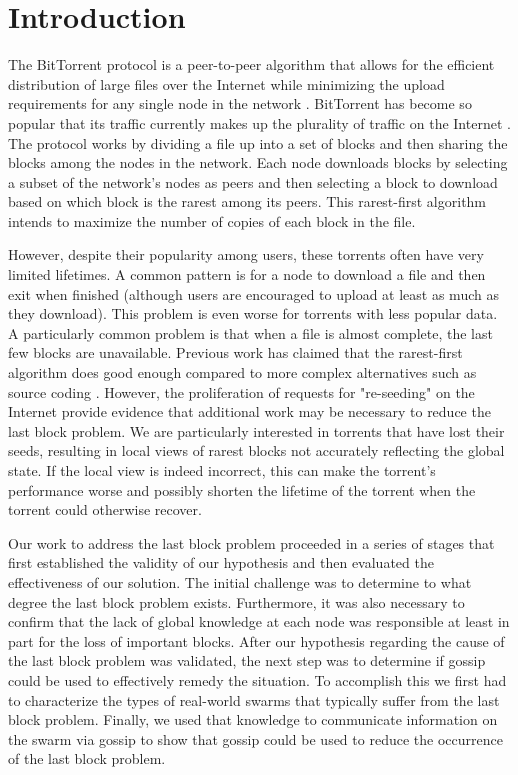 \section{Introduction}

The BitTorrent protocol is a peer-to-peer algorithm that allows for
the efficient distribution of large files over the Internet while
minimizing the upload requirements for any single node in the network
\cite{bep003}. BitTorrent has become so popular that its traffic currently
makes up the plurality of traffic on the Internet \cite{istudy08}. The
protocol works by dividing a file up into a set of blocks and then
sharing the blocks among the nodes in the network. Each node downloads
blocks by selecting a subset of the network's nodes as peers and then
selecting a block to download based on which block is the rarest among
its peers. This rarest-first algorithm intends to maximize the number
of copies of each block in the file.


However, despite their popularity among users, these torrents often have
very limited lifetimes. A common pattern is for a node to download a file
and then exit when finished (although users are encouraged to upload at
least as much as they download). This problem is even worse for torrents
with less popular data. A particularly common problem is that when a file
is almost complete, the last few blocks are unavailable. Previous work
has claimed that the rarest-first algorithm does good enough compared to
more complex alternatives such as source coding \cite{legout:1}. However,
the proliferation of requests for "re-seeding" on the Internet provide
evidence that additional work may be necessary to reduce the last block
problem. We are particularly interested in torrents that have lost
their seeds, resulting in local views of rarest blocks not accurately
reflecting the global state. If the local view is indeed incorrect,
this can make the torrent's performance worse and possibly shorten the
lifetime of the torrent when the torrent could otherwise recover.


Our work to address the last block problem proceeded in a series of stages
that first established the validity of our hypothesis and then evaluated
the effectiveness of our solution. The initial challenge was to determine
to what degree the last block problem exists. Furthermore,  it was also
necessary to confirm that the lack of global knowledge at each node was
responsible at least in part for the loss of important blocks. After our
hypothesis regarding the cause of the last block problem was validated,
the next step was to determine if gossip could be used to effectively
remedy the situation. To accomplish this we first had to characterize
the types of real-world swarms that typically suffer from the last block
problem. Finally, we used that knowledge to communicate information on
the swarm via gossip to show that gossip could be used to reduce the
occurrence of the last block problem.


